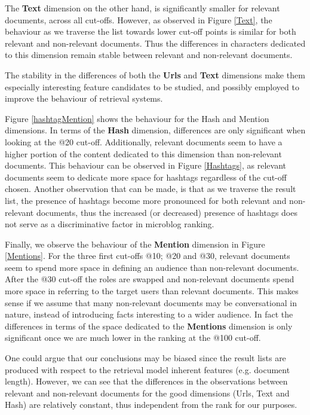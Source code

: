 The \textbf{Text} dimension on the other hand, is significantly smaller for relevant documents, across all cut-offs. However, as observed in Figure \ref{Text}, the behaviour as we traverse the list towards lower cut-off points is similar for both relevant and non-relevant documents. Thus the differences in characters dedicated to this dimension remain stable between relevant and non-relevant documents.

The stability in the differences of both the \textbf{Urls} and \textbf{Text} dimensions make them especially interesting feature candidates to be studied, and possibly employed to improve the behaviour of retrieval systems.



Figure \ref{hashtagMention} shows the behaviour for the Hash and Mention dimensions. In terms of the \textbf{Hash} dimension, differences are only significant when looking at the @20 cut-off. Additionally, relevant documents seem to have a higher portion of the content dedicated to this dimension than non-relevant documents. This behaviour can be observed in Figure \ref{Hashtags}, as relevant documents seem to dedicate more space for hashtags regardless of the cut-off chosen. Another observation that can be made, is that as we traverse the result list, the presence of hashtags become more pronounced for both relevant and non-relevant documents, thus the increased (or decreased) presence of hashtags does not serve as a discriminative factor in microblog ranking.

Finally, we observe the behaviour of the \textbf{Mention} dimension in Figure \ref{Mentions}. For the three first cut-offs @10; @20 and @30, relevant documents seem to spend more space in defining an audience than non-relevant documents. After the @30 cut-off the roles are swapped and non-relevant documents spend more space in referring to the target users than relevant documents. This makes sense if we assume that many non-relevant documents may be conversational in nature, instead of introducing facts interesting to a wider audience. In fact the differences in terms of the space dedicated to the \textbf{Mentions} dimension is only significant once we are much lower in the ranking at the @100 cut-off.

One could argue that our conclusions may be biased since the result lists are produced with respect to the retrieval model inherent features (e.g. document length). However, we can see that the differences in the observations between relevant and non-relevant documents for the good dimensions (Urls, Text and Hash) are relatively constant, thus independent from the rank for our purposes.

